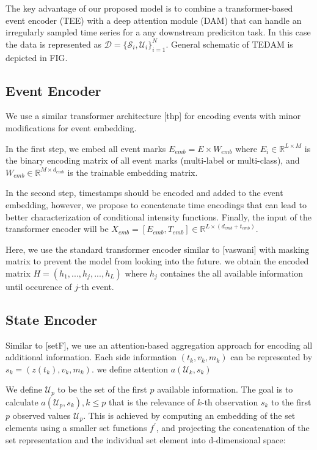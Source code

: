 \documentclass[journal,twoside,web]{ieeecolor}
\begin{document}
 The key advantage of our proposed model is to combine a  transformer-based event encoder (TEE) with a deep attention module (DAM) that can handle an irregularly sampled time series for a any downstream prediciton task. In this case the data is represented as $\mathcal{D}=\{\mathcal{S}_i,\mathcal{U}_i\}_{i=1}^{N}$. General schematic of TEDAM is depicted in FIG.





\subsection{Event Encoder}
We use a similar transformer architecture [thp] for encoding events with minor modifications for event embedding.


In the first step, we embed all event marks $E_{emb}=E \times W_{emb}$ where $E_i \in \mathbb{R}^{L \times M}$ is the binary encoding matrix of all event marks (multi-label or multi-class), and  $ W_{emb} \in  \mathbb{R}^{M \times d_{emb} }  $ is the trainable embedding matrix. 

In the second step, timestamps should be encoded and added to the event embedding, however, we propose to concatenate time encodings that can lead to better characterization of conditional intensity functions. Finally, the input of the transformer encoder will be $X_{emb}=[E_{emb}, T_{emb}] \in \mathbb{R}^{L \times (d_{emb}+t_{emb})}$.

Here, we use the standard transformer encoder similar to [vaswani] with masking matrix to prevent the model from looking into the future. we obtain the encoded matrix  $ H=(h_1, ..., h_j, ..., h_L) $ where $h_j$ containes the all available information until occurence of $j$-th event.






\subsection{State Encoder}

Similar to [setF], we use an attention-based aggregation approach for encoding all additional information. Each side information  $ (t_k, v_k, m_k) $ can be represented by $s_k=(z(t_k), v_k, m_k)$. we define attention $a(\mathcal{U}_k,s_k )$

We define $\mathcal{U}_p$ to be the set of the first $p$ available information.
The goal is to calculate $a(\mathcal{U}_p,s_k ), k \leq p$ that is the relevance of $k$-th observation $s_k$ to the first $p$ observed values $\mathcal{U}_p$.
This is achieved by computing an embedding of the set elements using a smaller set functions $f^{\prime}$, and projecting the concatenation of the set representation and the individual set element into d-dimensional space:
\end{document}
